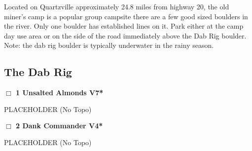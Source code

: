 \begin{multicols}{2}
Located on Quartzville approximately 24.8 miles from highway 20, the old miner's camp is a popular group campsite there are a few good sized boulders in the river. Only one boulder has established lines on it. Park either at the camp day use area or on the side of the road immediately above the Dab Rig boulder. Note: the dab rig boulder is typically underwater in the rainy season.\\




\needspace{3em}
\subsection*{The Dab Rig}\label{bf:The Dab Rig}




\needspace{2em}
\label{rt:Unsalted Almonds}
\colorbox{Goldenrod!20}{
\parbox{0.95\linewidth}{
\hspace{-1ex}\textbf{$\Box$
1 Unsalted Almonds V7*  
}}}
\begin{adjustwidth}{1.3em}{}			

PLACEHOLDER
  (No Topo)
\end{adjustwidth}




\needspace{2em}
\label{rt:Dank Commander}
\colorbox{RoyalBlue!20}{
\parbox{0.95\linewidth}{
\hspace{-1ex}\textbf{$\Box$
2 Dank Commander V4*  
}}}
\begin{adjustwidth}{1.3em}{}			

PLACEHOLDER
  (No Topo)
\end{adjustwidth}






\end{multicols}
\clearpage